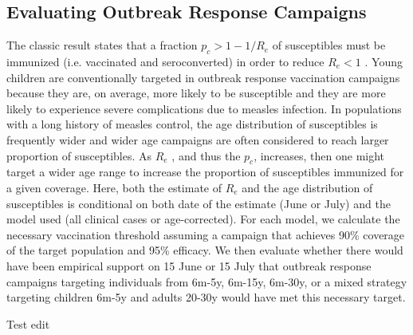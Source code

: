 \subsection{Evaluating Outbreak Response Campaigns}\label{ori}

The classic result states that a fraction \(p_c \gt 1-1/R_e\) of susceptibles must be immunized
(i.e. vaccinated and seroconverted) in order to reduce
\(R_e \lt 1\) \cite{Anderson_1981}. Young
children are conventionally targeted in outbreak response vaccination
campaigns because they are, on average, more likely to be susceptible
and they are more likely to experience severe complications due to
measles infection. In populations with a long history of measles
control, the age distribution of susceptibles is frequently wider \cite{23798689} and wider age campaigns are often
considered to reach larger proportion of susceptibles. As
\(R_e\) , and thus the \(p_c\),
increases, then one might target a wider age range to increase the
proportion of susceptibles immunized for a given coverage. Here, both
the estimate of \(R_e\) and the age distribution of
susceptibles is conditional on both date of the estimate (June or July)
and the model used (all clinical cases or age-corrected). For each
model, we calculate the necessary vaccination threshold assuming a
campaign that achieves 90\% coverage of the target population and 95\%
efficacy. We then evaluate whether there would have been empirical
support on 15 June or 15 July that outbreak response campaigns targeting
individuals from 6m-5y, 6m-15y, 6m-30y, or a mixed strategy targeting
children 6m-5y and adults 20-30y would have met this necessary target.

Test edit